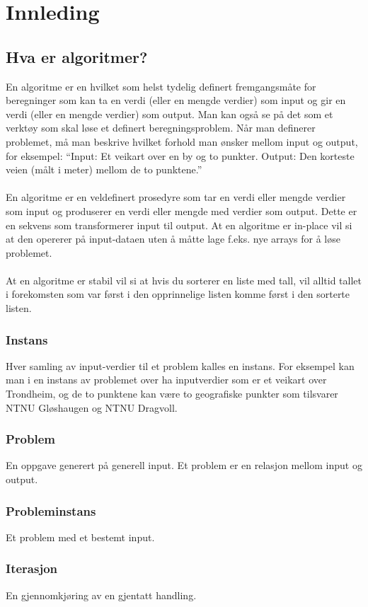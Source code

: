 \section{Innleding}
\newenvironment{boxed}
    {\begin{center}
    \begin{tabular}{|p{0.9\textwidth}|}
    \hline\\
    }
    { 
    \\\\\hline
    \end{tabular} 
    \end{center}
    }
\subsection{Hva er algoritmer?}
En algoritme er en hvilket som helst tydelig definert fremgangsmåte for beregninger som kan ta en verdi (eller en mengde verdier) som input og gir en verdi (eller en mengde verdier) som output. Man kan også se på det som et verktøy som skal løse et definert beregningsproblem. Når man definerer problemet, må man beskrive hvilket forhold man ønsker mellom input og output, for eksempel: “Input: Et veikart over en by og to punkter. Output: Den korteste veien (målt i meter) mellom de to punktene.”
\\\\
En algoritme er en veldefinert prosedyre som tar en verdi eller mengde verdier som input og produserer en verdi eller mengde med verdier som output. Dette er en sekvens som transformerer input til output.
At en algoritme er in-place vil si at den opererer på input-dataen uten å måtte lage f.eks. nye arrays for å løse problemet.
\\\\
At en algoritme er stabil vil si at hvis du sorterer en liste med tall, vil alltid tallet i forekomsten som var først i den opprinnelige listen komme først i den sorterte listen.

\subsubsection{Instans}
Hver samling av input-verdier til et problem kalles en instans. For eksempel kan man i en instans av problemet over ha inputverdier som er et veikart over Trondheim, og de to punktene kan være to geografiske punkter som tilsvarer NTNU Gløshaugen og NTNU Dragvoll.

\subsubsection{Problem}
En oppgave generert på generell input. Et problem er en relasjon mellom input og output.

\subsubsection{Probleminstans}
Et problem med et bestemt input. 

\subsubsection{Iterasjon}
En gjennomkjøring av en gjentatt handling.

